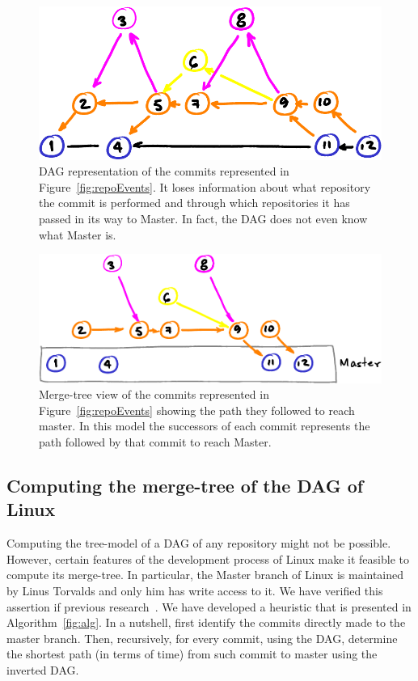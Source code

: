 \documentclass[conference, draftclsnofoot, draft]{IEEEtran}
\begin{document}
\begin{figure}[htbp]
  \centering
        \includegraphics[width=.8\columnwidth]{figures/dag.pdf}
  \caption{DAG representation of the commits represented in Figure~\ref{fig:repoEvents}. It loses information about what repository the commit is performed and
    through which repositories it has passed in its way to Master. In fact, the DAG does not even know what Master is.}
  \label{fig:repoDAG}
\end{figure}

\begin{figure}[htbp]
  \centering
        \includegraphics[width=\columnwidth]{figures/tree.pdf}
  \caption{Merge-tree view of the commits  represented in Figure~\ref{fig:repoEvents} showing the path they followed to reach master. In this model the successors of
    each commit represents the path followed by that commit to reach Master.}
  \label{fig:repoTree}
\end{figure}


\subsection{Computing the merge-tree of the DAG of Linux}

Computing the tree-model of a DAG of any repository might not be possible. However, certain features of the development process of Linux make it feasible to
compute its merge-tree. In particular, the Master branch of Linux is maintained by Linus Torvalds and only him has write access to it. We have verified this
assertion if previous research~\cite{German2015}. We have developed a heuristic that is presented in Algorithm~\ref{fig:alg}. In a nutshell, first identify the commits directly made
to the master branch. Then,
recursively, for
every commit, using the DAG, determine the shortest path (in terms of time) from such commit to master using the inverted DAG.
\end{document}
